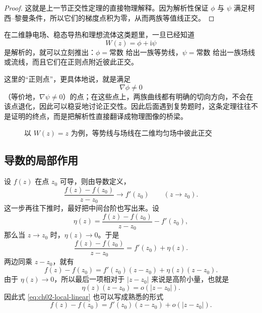 \begin{proof}
这就是上一节正交性定理的直接物理解释。因为解析性保证 $\phi$ 与 $\psi$ 满足柯西--黎曼条件，所以它们的梯度点积为零，从而两族等值线正交。
\end{proof}

\begin{tishi}[物理题里怎样使用这条定理]
在二维静电场、稳态导热和理想流体这类题里，一旦已经知道
\[
    W(z)=\phi+\mathrm{i}\psi
\]
是解析的，就可以立刻推出：$\phi=\text{常数}$ 给出一族等势线，$\psi=\text{常数}$ 给出一族场线或流线，而且它们在正则点附近彼此正交。

这里的``正则点''，更具体地说，就是满足
\[
    \nabla \phi\neq 0
\]
（等价地，$\nabla \psi\neq 0$）的点；在这些点上，两族曲线都有明确的切向方向，不会在该点退化，因此可以稳妥地讨论正交性。因此后面遇到复势题时，这条定理往往不是证明的终点，而是把解析性直接翻译成物理图像的桥梁。
\end{tishi}

\begin{figure}[htbp]
\centering
{}
\caption{以 $W(z)=z$ 为例，等势线与场线在二维均匀场中彼此正交}
\label{fig:ch02-potential-lines}
\end{figure}

\subsection{导数的局部作用}

设 $f(z)$ 在点 $z_0$ 可导，则由导数定义，
\[
    \frac{f(z)-f(z_0)}{z-z_0}\to f'(z_0)\qquad (z\to z_0).
\]
这一步再往下推时，最好把中间台阶也写出来。设
\[
    \eta(z)=\frac{f(z)-f(z_0)}{z-z_0}-f'(z_0),
\]
那么当 $z\to z_0$ 时，$\eta(z)\to 0$。于是
\[
    \frac{f(z)-f(z_0)}{z-z_0}=f'(z_0)+\eta(z).
\]
两边同乘 $z-z_0$，就有
\begin{equation}\label{eq:ch02-local-linear}
    f(z)-f(z_0)=f'(z_0)(z-z_0)+\eta(z)(z-z_0).
\end{equation}
由于 $\eta(z)\to 0$，所以最后一项相对于 $|z-z_0|$ 来说是高阶小量，也就是
\[
    \eta(z)(z-z_0)=o(|z-z_0|).
\]
因此式 \eqref{eq:ch02-local-linear} 也可以写成熟悉的形式
\[
    f(z)-f(z_0)=f'(z_0)(z-z_0)+o(|z-z_0|).
\]

